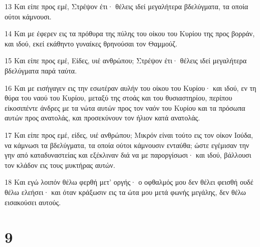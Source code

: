 \par 13 Και είπε προς εμέ, Στρέψον έτι· θέλεις ιδεί μεγαλήτερα βδελύγματα, τα οποία ούτοι κάμνουσι.
\par 14 Και με έφερεν εις τα πρόθυρα της πύλης του οίκου του Κυρίου της προς βορράν, και ιδού, εκεί εκάθηντο γυναίκες θρηνούσαι τον Θαμμούζ.
\par 15 Και είπε προς εμέ, Είδες, υιέ ανθρώπου; Στρέψον έτι· θέλεις ιδεί μεγαλήτερα βδελύγματα παρά ταύτα.
\par 16 Και με εισήγαγεν εις την εσωτέραν αυλήν του οίκου του Κυρίου· και ιδού, εν τη θύρα του ναού του Κυρίου, μεταξύ της στοάς και του θυσιαστηρίου, περίπου είκοσιπέντε άνδρες με τα νώτα αυτών προς τον ναόν του Κυρίου και τα πρόσωπα αυτών προς ανατολάς, και προσεκύνουν τον ήλιον κατά ανατολάς.
\par 17 Και είπε προς εμέ, είδες, υιέ ανθρώπου; Μικρόν είναι τούτο εις τον οίκον Ιούδα, να κάμνωσι τα βδελύγματα, τα οποία ούτοι κάμνουσιν ενταύθα; ώστε εγέμισαν την γην από καταδυναστείας και εξέκλιναν διά να με παροργίσωσι· και ιδού, βάλλουσι τον κλάδον εις τους μυκτήρας αυτών.
\par 18 Και εγώ λοιπόν θέλω φερθή μετ' οργής· ο οφθαλμός μου δεν θέλει φεισθή ουδέ θέλω ελεήσει· και όταν κράξωσιν εις τα ώτα μου μετά φωνής μεγάλης, δεν θέλω εισακούσει αυτούς.

\chapter{9}

